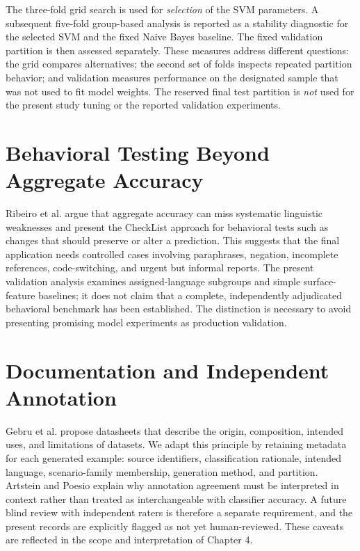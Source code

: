 The three-fold grid search is used for \emph{selection} of the SVM parameters. A subsequent five-fold group-based analysis is reported as a stability diagnostic for the selected SVM and the fixed Naive Bayes baseline. The fixed validation partition is then assessed separately. These measures address different questions: the grid compares alternatives; the second set of folds inspects repeated partition behavior; and validation measures performance on the designated sample that was not used to fit model weights. The reserved final test partition is \emph{not} used for the present study tuning or the reported validation experiments.

\section{Behavioral Testing Beyond Aggregate Accuracy}
Ribeiro et al. \cite{ribeiro} argue that aggregate accuracy can miss systematic linguistic weaknesses and present the CheckList approach for behavioral tests such as changes that should preserve or alter a prediction. This suggests that the final application needs controlled cases involving paraphrases, negation, incomplete references, code-switching, and urgent but informal reports. The present validation analysis examines assigned-language subgroups and simple surface-feature baselines; it does not claim that a complete, independently adjudicated behavioral benchmark has been established. The distinction is necessary to avoid presenting promising model experiments as production validation.

\section{Documentation and Independent Annotation}
Gebru et al. \cite{datasheets} propose datasheets that describe the origin, composition, intended uses, and limitations of datasets. We adapt this principle by retaining metadata for each generated example: source identifiers, classification rationale, intended language, scenario-family membership, generation method, and partition. Artstein and Poesio \cite{artstein} explain why annotation agreement must be interpreted in context rather than treated as interchangeable with classifier accuracy. A future blind review with independent raters is therefore a separate requirement, and the present records are explicitly flagged as not yet human-reviewed. These caveats are reflected in the scope and interpretation of Chapter 4.
